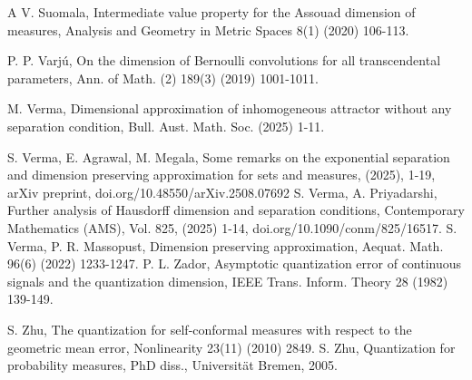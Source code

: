 \documentclass{amsproc}
\theoremstyle{definition}
\theoremstyle{remark}
\numberwithin{equation}{section}
\begin{document}
\begin{thebibliography}{A}
 V. Suomala, Intermediate value property for the Assouad dimension of measures, Analysis and Geometry in Metric Spaces 8(1) (2020) 106-113.


 P. P. Varj\'u, On the dimension of Bernoulli convolutions for all transcendental parameters, Ann. of Math. (2) 189(3) (2019) 1001-1011.

 M. Verma, Dimensional approximation of inhomogeneous attractor without any separation condition, Bull. Aust. Math. Soc. (2025) 1-11.


      S. Verma, E. Agrawal, M. Megala, Some remarks on the exponential separation and dimension preserving approximation for sets and measures, (2025), 1-19, arXiv preprint, doi.org/10.48550/arXiv.2508.07692
 S. Verma, A. Priyadarshi, Further analysis of Hausdorff dimension and separation conditions, Contemporary Mathematics (AMS), Vol. 825, (2025) 1-14, doi.org/10.1090/conm/825/16517.
  S. Verma, P. R. Massopust, Dimension preserving approximation, Aequat. Math. 96(6) (2022) 1233-1247.
     P. L. Zador, Asymptotic quantization error of continuous signals and the
     quantization dimension, IEEE Trans. Inform. Theory 28 (1982) 139-149.
    
     S. Zhu, The quantization for self-conformal measures with respect to the geometric mean error, Nonlinearity 23(11) (2010) 2849.
 S. Zhu, Quantization for probability measures, PhD diss., Universität Bremen, 2005.
\end{thebibliography}
\end{document}
